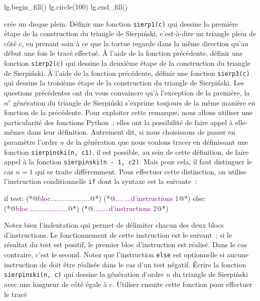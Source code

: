 \documentclass{magnolia}
\begin{document}
\begin{questions}
\begin{pythoncode}
lg.begin_fill()
lg.circle(100)
lg.end_fill()
\end{pythoncode}
crée un disque plein.
\question Définir une fonction \verb!sierp1(c)! qui dessine la première étape de la construction du triangle
  de Sierpi\'nski, c'est-à-dire un triangle plein de côté $c$, en prenant soin à ce que la tortue regarde dans
  la même direction qu'au début une fois le tracé effectué.
\question À l'aide de la fonction précédente, définir une fonction \verb!sierp2(c)! qui dessine la deuxième
  étape de la construction du triangle de Sierpi\'nski.
\question À l'aide de la fonction précédente, définir une fonction \verb!sierp3(c)! qui dessine la troisième
  étape de la construction du triangle de Sierpi\'nski.
\enonce Les questions précédentes ont du vous convaincre qu'à l'exception de la première, la $n^e$ génération
  du triangle de Sierpi\'nski s'exprime toujours de la même manière en fonction de la précédente. Pour exploiter
  cette remarque, nous allons utiliser une particularité des fonctions Python~: elles ont la possibilité de
  faire appel à elle-mêmes dans leur définition. Autrement dit, si nous choisissons de passer en paramètre l'ordre
  $n$ de la génération que nous voulons tracer en définissant une fonction \verb!sierpinski(n, c1)!, il est possible,
  au sein de cette définition, de faire appel à la fonction \verb!sierpinski(n - 1, c2)!. Mais pour cela, il faut
  distinguer le cas $n=1$ qui se traite différemment. Pour effectuer cette distinction, on utilise l'instruction
  conditionnelle \verb!if! dont la syntaxe est la suivante~:
\begin{pythoncode}
if test:
    (*@\textcolor{purple}{bloc....................}@*)
    (*@\textcolor{purple}{........d'instructions 1}@*)
else:
    (*@\textcolor{purple}{bloc....................}@*)
    (*@\textcolor{purple}{........d'instructions 2}@*)
\end{pythoncode}
Notez bien l'indentation qui permet de délimiter chacun des deux blocs d'instructions. Le fonctionnement de
cette instruction est le suivant~: si le résultat du test est positif, le premier bloc d'instruction est
réalisé. Dans le cas contraire, c'est le second. Notez que l'instruction \verb!else! est optionnelle si aucune
instruction de doit être réalisée dans le cas d'un test négatif. 
\question Écrire la fonction \verb!sierpinski(n, c)! qui dessine la génération d'ordre $n$ du triangle de
  Sierpi\'nski avec une longueur de côté égale à $c$. Utiliser ensuite cette fonction pour effectuer le tracé

\end{questions}
\end{document}
